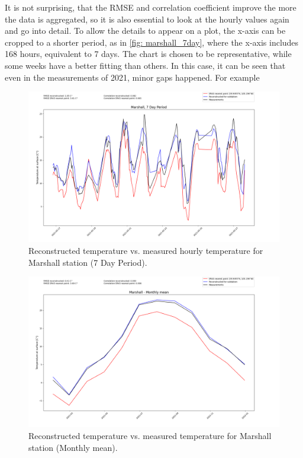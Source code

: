It is not surprising, that the RMSE and correlation coefficient improve the more the data is aggregated, so it is also essential to look at the hourly values again and go into detail. To allow the details to appear on a plot, the x-axis can be cropped to a shorter period, as in \autoref{fig: marshall_7day}, where the x-axis includes 168 hours, equivalent to 7 days.
The chart is chosen to be representative, while some weeks have a better fitting than others. In this case, it can be seen that even in the measurements of 2021, minor gaps happened. For example  


\begin{figure}
    \centering
    \includegraphics[width=1.00\textwidth]{resources/images/charts/marshall_eval_grib_final/Marshall, 7 Day Period_1_2_3.png}
    \caption{Reconstructed temperature vs. measured hourly temperature for Marshall station (7 Day Period).}
    \label{fig: marshall_7day}
\end{figure}

\begin{figure}
    \centering
    \includegraphics[width=1.00\textwidth]{resources/images/charts/marshall_eval_grib_final/Marshall - Monthly mean.png}
    \caption{Reconstructed temperature vs. measured temperature for Marshall station (Monthly mean).}
\end{figure}

